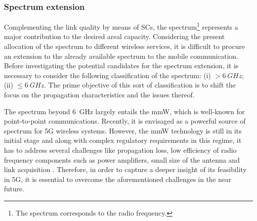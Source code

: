 \subsubsection*{Spectrum extension}
Complementing the link quality by means of SCs, the spectrum\footnote{The spectrum corresponds to the radio frequency.} represents a major contribution to the desired areal capacity. Considering the present allocation of the spectrum to different wireless services, it is difficult to procure an extension to the already available spectrum to the mobile communication. Before investigating the potential candidates for the spectrum extension, it is necessary to consider the following classification of the spectrum:
(i) $> \SI{6}{GHz}$;
(ii) $\le \SI{6}{GHz}$.
The prime objective of this sort of classification is to shift the focus on the propagation characteristics and the issues thereof.


The spectrum beyond \SI{6}{GHz} largely entails the mmW, which is well-known for point-to-point communications. Recently, it is envisaged as a powerful source of spectrum for 5G wireless systems. However, the mmW technology is still in its initial stage and along with complex regulatory requirements in this regime, it has to address several challenges like propagation loss, low efficiency of radio frequency components such as power amplifiers, small size of the antenna and link acquisition \cite{Rapp13}. Therefore, in order to capture a deeper insight of its feasibility in 5G, it is essential to overcome the aforementioned challenges in the near future.

